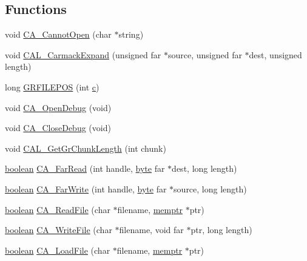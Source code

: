 \subsection*{Functions}
\begin{DoxyCompactItemize}
\item 
void \hyperlink{ID__CA_8C_a416e0b80d0b6e62ba220aebd9b69dbb8}{CA\_\-CannotOpen} (char $\ast$string)
\item 
void \hyperlink{ID__CA_8C_ab27354a2a5e6294b670d092bfa9af9d9}{CAL\_\-CarmackExpand} (unsigned far $\ast$source, unsigned far $\ast$dest, unsigned length)
\item 
long \hyperlink{ID__CA_8C_a8568e471bb25a89e1bc53f8ca0a629c2}{GRFILEPOS} (int \hyperlink{ID__VH_8C_a6a23f31bb58d6a932349aa926c720e47}{c})
\item 
void \hyperlink{ID__CA_8C_a9094160617fdfa866053f3b4a8387dc9}{CA\_\-OpenDebug} (void)
\item 
void \hyperlink{ID__CA_8C_a72ac49cbfaaa2ed17141f17e50b30558}{CA\_\-CloseDebug} (void)
\item 
void \hyperlink{ID__CA_8C_a1501fbd497c9306ea865625e9382e532}{CAL\_\-GetGrChunkLength} (int chunk)
\item 
\hyperlink{ID__HEAD_8H_a7c6368b321bd9acd0149b030bb8275ed}{boolean} \hyperlink{ID__CA_8C_a9d7ef0e3d4f10f25abd940094a4db437}{CA\_\-FarRead} (int handle, \hyperlink{ID__HEAD_8H_a0c8186d9b9b7880309c27230bbb5e69d}{byte} far $\ast$dest, long length)
\item 
\hyperlink{ID__HEAD_8H_a7c6368b321bd9acd0149b030bb8275ed}{boolean} \hyperlink{ID__CA_8C_a2577d7c247ebeb91941abed324b1035b}{CA\_\-FarWrite} (int handle, \hyperlink{ID__HEAD_8H_a0c8186d9b9b7880309c27230bbb5e69d}{byte} far $\ast$source, long length)
\item 
\hyperlink{ID__HEAD_8H_a7c6368b321bd9acd0149b030bb8275ed}{boolean} \hyperlink{ID__CA_8C_a4ec80fcd3a66374c4253d51b4fada60d}{CA\_\-ReadFile} (char $\ast$filename, \hyperlink{ID__MM_8H_a04062decc7eb282b066c65e9137bb9bf}{memptr} $\ast$ptr)
\item 
\hyperlink{ID__HEAD_8H_a7c6368b321bd9acd0149b030bb8275ed}{boolean} \hyperlink{ID__CA_8C_a1f669cb7875ea0acf136824a1fa1d60f}{CA\_\-WriteFile} (char $\ast$filename, void far $\ast$ptr, long length)
\item 
\hyperlink{ID__HEAD_8H_a7c6368b321bd9acd0149b030bb8275ed}{boolean} \hyperlink{ID__CA_8C_a99379c81fecc0c0c0c1873f839f1116f}{CA\_\-LoadFile} (char $\ast$filename, \hyperlink{ID__MM_8H_a04062decc7eb282b066c65e9137bb9bf}{memptr} $\ast$ptr)
\item 

\end{DoxyCompactItemize}
